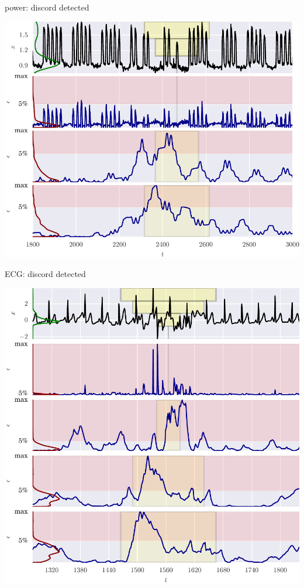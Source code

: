 \documentclass{beamer}
\begin{document}
    \begin{frame}{power: discord detected}

      \includegraphics[width=\textwidth]{figs/er_power.pdf}

    \end{frame}


    \begin{frame}{ECG: discord detected}

      \includegraphics[height=\textheight]{figs/er_ecg.pdf}

    \end{frame}
\end{document}
